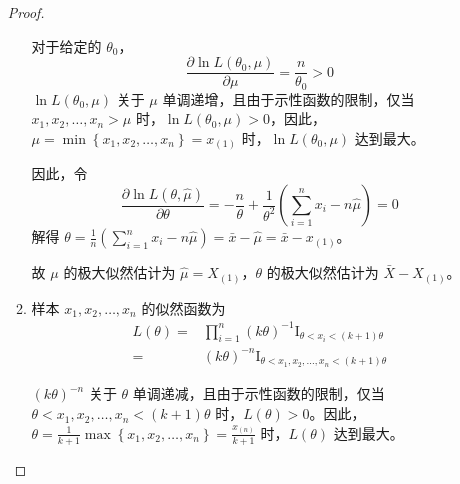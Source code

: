 \documentclass[normal,founder,mtpro2,cn]{elegantnote}
\begin{document}
\begin{enumerate}
\begin{proof}
\begin{enumerate}
                      对于给定的 $\theta_{0}$，
                      \begin{equation*}
                          \frac{\partial\ln L(\theta_{0},\mu)}{\partial\mu}=\frac{n}{\theta_{0}}>0
                      \end{equation*}
                      $\ln L(\theta_{0},\mu)$ 关于 $\mu$ 单调递增，且由于示性函数的限制，仅当 $x_{1},x_{2},\ldots,x_{n}>\mu$ 时，$\ln L(\theta_{0},\mu)>0$，因此，$\mu=\min\left\{x_{1},x_{2},\ldots,x_{n}\right\}=x_{(1)}$ 时，$\ln L(\theta_{0},\mu)$ 达到最大。

                      因此，令
                      \begin{equation*}
                          \frac{\partial\ln L(\theta,\hat{\mu})}{\partial\theta}=-\frac{n}{\theta}+\frac{1}{\theta^{2}}\left(\sum_{i=1}^{n}x_{i}-n\hat{\mu}\right)=0
                      \end{equation*}
                      解得 $\theta=\frac{1}{n}\left(\sum_{i=1}^{n}x_{i}-n\hat{\mu}\right)=\bar{x}-\hat{\mu}=\bar{x}-x_{(1)}$。

                      故 $\mu$ 的极大似然估计为 $\hat{\mu}=X_{(1)}$，$\theta$ 的极大似然估计为 $\bar{X}-X_{(1)}$。
                \item
                      样本 $x_{1},x_{2},\ldots,x_{n}$ 的似然函数为
                      \begin{equation*}
                          \begin{aligned}
                              L(\theta)= & \prod_{i=1}^{n}(k\theta)^{-1}\mathrm{I}_{\theta<x_{i}<(k+1)\theta}     \\
                              =          & (k\theta)^{-n}\mathrm{I}_{\theta<x_{1},x_{2},\ldots,x_{n}<(k+1)\theta}
                          \end{aligned}
                      \end{equation*}

                      $(k\theta)^{-n}$ 关于 $\theta$ 单调递减，且由于示性函数的限制，仅当 $\theta<x_{1},x_{2},\ldots,x_{n}<(k+1)\theta$ 时，$L(\theta)>0$。因此，$\theta=\frac{1}{k+1}\max\left\{x_{1},x_{2},\ldots,x_{n}\right\}=\frac{x_{(n)}}{k+1}$ 时，$L(\theta)$ 达到最大。


\end{enumerate}
\end{proof}
\end{enumerate}
\end{document}
